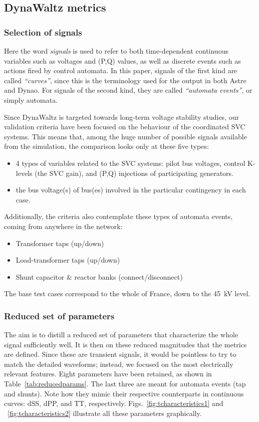 \documentclass[conference]{IEEEtran}
\newcommand{\Dynawo}{Dyna\textomega o} %
\begin{document}
\subsection{DynaWaltz metrics}

\subsubsection{Selection of signals}
Here the word \emph{signals} is used to refer to both time-dependent continuous
variables such as voltages and (P,Q) values, as well as discrete events such as
actions fired by control automata. In this paper, signals of the first kind are
called \emph{``curves''}, since this is the terminology used for the output in
both Astre and \Dynawo. For signals of the second kind, they are called
\emph{``automata events''}, or simply automata.

Since DynaWaltz is targeted towards long-term voltage stability studies, our
validation criteria have been focused on the behaviour of the coordinated SVC
systems. This means that, among the huge number of possible signals available
from the simulation, the comparison looks only at these five types:
\begin{itemize}
  \item 4 types of variables related to the SVC systems: pilot bus voltages,
        control K-levels (the SVC gain), and (P,Q) injections of participating
        generators.
  \item the bus voltage(s) of bus(es) involved in the particular
        contingency in each case.
\end{itemize}
Additionally, the criteria also contemplate these types of automata events,
coming from anywhere in the network:
\begin{itemize}
  \item Transformer taps (up/down)
  \item Load-transformer taps (up/down)
  \item Shunt capacitor \& reactor banks (connect/disconnect)
\end{itemize}
The base test cases correspond to the whole of France, down to the \SI{45}{kV}
level.


\subsubsection{Reduced set of parameters}
The aim is to distill a reduced set of parameters that characterize the whole
signal sufficiently well. It is then on these reduced magnitudes that the
metrics are defined.  Since these are transient signals, it would be pointless
to try to match the detailed waveforms; instead, we focused on the most
electrically relevant features.  Eight parameters have been retained, as shown
in Table~\ref{tab:reducedparams}. The last three are meant for automata events
(tap and shunts). Note how they mimic their respective counterparts in
continuous curves: dSS, dPP, and TT,
respectively. Figs.~\ref{fig:tcharacteristics1} and ~\ref{fig:tcharacteristics2}
illustrate all these parameters graphically.
\end{document}
